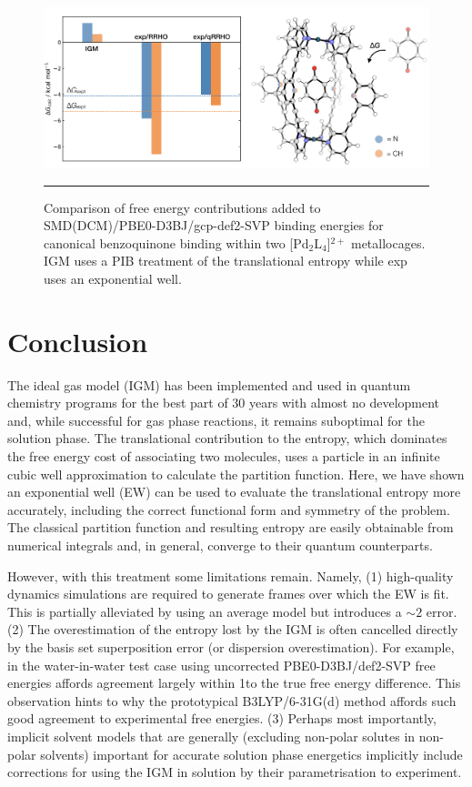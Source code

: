 \documentclass[../main.tex]{subfiles}
\begin{document}
\vspace{0.4cm}
\begin{figure}[h!]
	\centering
	\includegraphics[width=\textwidth]{4/figs/figX12/figX12}
	\vspace{0.2cm}
	\hrule
	\caption{Comparison of free energy contributions added to SMD(DCM)/PBE0-D3BJ/gcp-def2-SVP binding energies for canonical benzoquinone binding within two [Pd$_2$L$_4$]${}^{2+}$ metallocages. IGM uses a PIB treatment of the translational entropy while exp uses an exponential well.} 
	\label{fig::entropy_X12}
\end{figure}


\clearpage
\section{Conclusion}

The ideal gas model (IGM) has been implemented and used in quantum chemistry programs for the best part of 30 years with almost no development and, while successful for gas phase reactions, it remains suboptimal for the solution phase. The translational contribution to the entropy, which dominates the free energy cost of associating two molecules, uses a particle in an infinite cubic well approximation to calculate the partition function. Here, we have shown an exponential well (EW) can be used to evaluate the translational entropy more accurately, including the correct functional form and symmetry of the problem. The classical partition function and resulting entropy are easily obtainable from numerical integrals and, in general, converge to their quantum counterparts. 

However, with this treatment some limitations remain. Namely, (1) high-quality dynamics simulations are required to generate frames over which the EW is fit. This is partially alleviated by using an average model but introduces a $\sim 2$ \kcalx error. (2) The overestimation of the entropy lost by the IGM is often cancelled directly by the basis set superposition error (or dispersion overestimation). For example, in the water-in-water test case using uncorrected PBE0-D3BJ/def2-SVP free energies affords agreement largely within 1\kcalx to the true free energy difference. This observation hints to why the prototypical B3LYP/6-31G(d) method affords such good agreement to experimental free energies. (3) Perhaps most importantly, implicit solvent models that are generally (excluding non-polar solutes in non-polar solvents) important for accurate solution phase energetics implicitly include corrections for using the IGM in solution by their parametrisation to experiment.
\end{document}
